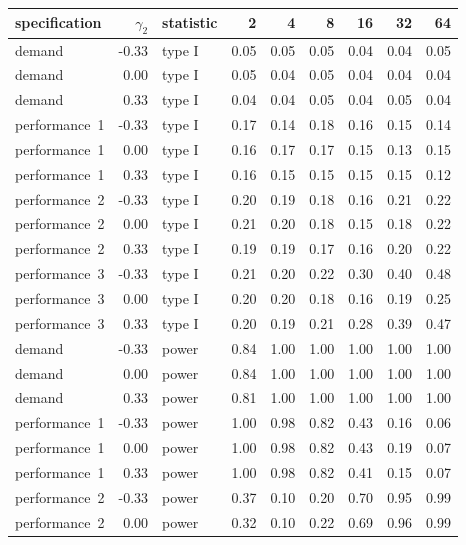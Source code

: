 \begin{table}[ht]
\centering
\begingroup\footnotesize
\begin{tabular}{lrlrrrrrr}
  \hline
specification & $\gamma_2$ & statistic & 2 & 4 & 8 & 16 & 32 & 64 \\ 
  \hline
demand & -0.33 & type I & 0.05 & 0.05 & 0.05 & 0.04 & 0.04 & 0.05 \\ 
  demand & 0.00 & type I & 0.05 & 0.04 & 0.05 & 0.04 & 0.04 & 0.04 \\ 
  demand & 0.33 & type I & 0.04 & 0.04 & 0.05 & 0.04 & 0.05 & 0.04 \\ 
  performance~1 & -0.33 & type I & 0.17 & 0.14 & 0.18 & 0.16 & 0.15 & 0.14 \\ 
  performance~1 & 0.00 & type I & 0.16 & 0.17 & 0.17 & 0.15 & 0.13 & 0.15 \\ 
  performance~1 & 0.33 & type I & 0.16 & 0.15 & 0.15 & 0.15 & 0.15 & 0.12 \\ 
  performance~2 & -0.33 & type I & 0.20 & 0.19 & 0.18 & 0.16 & 0.21 & 0.22 \\ 
  performance~2 & 0.00 & type I & 0.21 & 0.20 & 0.18 & 0.15 & 0.18 & 0.22 \\ 
  performance~2 & 0.33 & type I & 0.19 & 0.19 & 0.17 & 0.16 & 0.20 & 0.22 \\ 
  performance~3 & -0.33 & type I & 0.21 & 0.20 & 0.22 & 0.30 & 0.40 & 0.48 \\ 
  performance~3 & 0.00 & type I & 0.20 & 0.20 & 0.18 & 0.16 & 0.19 & 0.25 \\ 
  performance~3 & 0.33 & type I & 0.20 & 0.19 & 0.21 & 0.28 & 0.39 & 0.47 \\ 
  demand & -0.33 & power & 0.84 & 1.00 & 1.00 & 1.00 & 1.00 & 1.00 \\ 
  demand & 0.00 & power & 0.84 & 1.00 & 1.00 & 1.00 & 1.00 & 1.00 \\ 
  demand & 0.33 & power & 0.81 & 1.00 & 1.00 & 1.00 & 1.00 & 1.00 \\ 
  performance~1 & -0.33 & power & 1.00 & 0.98 & 0.82 & 0.43 & 0.16 & 0.06 \\ 
  performance~1 & 0.00 & power & 1.00 & 0.98 & 0.82 & 0.43 & 0.19 & 0.07 \\ 
  performance~1 & 0.33 & power & 1.00 & 0.98 & 0.82 & 0.41 & 0.15 & 0.07 \\ 
  performance~2 & -0.33 & power & 0.37 & 0.10 & 0.20 & 0.70 & 0.95 & 0.99 \\ 
  performance~2 & 0.00 & power & 0.32 & 0.10 & 0.22 & 0.69 & 0.96 & 0.99 \\ 

\end{tabular}
\end{table}
